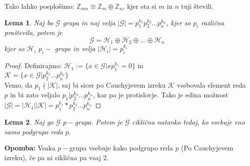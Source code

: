 \documentclass[a4paper]{article}
\newcounter{environment:definition_counter}
\newcounter{environment:theorem_counter}
\newcounter{environment:statement_counter}
\newenvironment{remark}
{\textbf{Opomba:}}
{}
\newtheorem{lemma}{Lema}
\begin{document}
Tako lahko posplošimo: $\mathbb{Z}_{mn} \cong \mathbb{Z}_m \oplus \mathbb{Z}_n$, kjer sta si $m$ in $n$ tuji števili.




\begin{lemma}
Naj bo $\mathcal{G}$ grupa in naj velja $|\mathcal{G}| = p_1^{k_1}p_2^{k_2} \dots p_n^{k_n}$, kjer so $p_i$ različna praštevila, potem je 
$$ \mathcal{G} = \mathcal{H}_1 \oplus \mathcal{H}_2 \oplus \dots \oplus \mathcal{H}_n$$
kjer so $\mathcal{H}_i$ $p_i-$ grupe in velja $|\mathcal{H}_i| = p_i^{k_i}$
\end{lemma}

\begin{proof}
Definirajmo: $\mathcal{H}_1 := \{ x \in \mathcal{G} | xp_1^{k_1} = 0\}$ in \\
$\mathcal{K} =  \{ x \in \mathcal{G} | p_2^{k_2} \dots p_n^{k_n} \}$\\
Vemo, da $p_1 \nmid | \mathcal{K}|$, saj bi sicer po Cauchyjevem izreku $\mathcal{K}$ vsebovala element reda $p$ in bi zato veljalo $p_1 | p_2^{k_2} \dots p_n^{k_n}$, kar pa je protislovje.
Tako je edina možnost $|\mathcal{G}| = |\mathcal{H}_1| |\mathcal{K}| = p_1^{k_1} * p_2^{k_2} \dots p_n^{k_n}$
\end{proof}

\begin{lemma}
Naj go $\mathcal{G}$ $p-$grupa. Potem je $\mathcal{G}$ ciklična natanko tedaj, ko vsebuje eno samo podgrupo reda $p$.
\end{lemma}

\begin{remark}
Vsaka $p-$grupa vsebuje kako podgrupo reda $p$ (Po Cauchyjevem izreku), če pa ni siklična pa vsaj $2$.
\end{remark}
\end{document}
